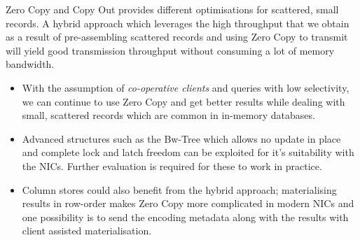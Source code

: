 Zero Copy and Copy Out provides different optimisations for scattered, small records. A hybrid approach 
which leverages the high throughput that we obtain as a result of pre-assembling scattered records and 
using Zero Copy to transmit will yield good transmission throughput without consuming a lot of memory bandwidth.
\begin{itemize}
\item With the assumption of {\em co-operative clients} and queries with low selectivity, we can continue 
to use Zero Copy and get better results while dealing with small, scattered records which are common in in-memory databases.
\item Advanced structures such as the Bw-Tree which allows no update in place and complete lock and latch freedom 
can be exploited for it's suitability with the NICs. Further evaluation is required for these to work in practice.
\item Column stores could also benefit from the hybrid approach; materialising results in row-order makes Zero Copy 
more complicated in modern NICs and one possibility is to send the encoding metadata along with the results with client assisted 
materialisation.
\end{itemize}


